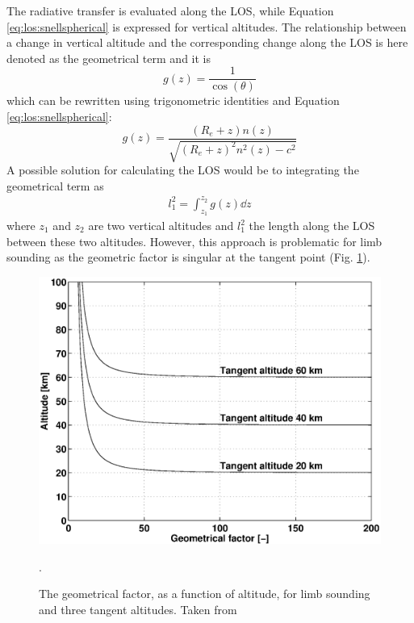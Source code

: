   The radiative transfer is evaluated along the LOS, while Equation 
  \ref{eq:los:snellspherical} is expressed for vertical altitudes.
  The relationship between a change in vertical altitude and the
  corresponding change along the LOS is here denoted as the geometrical term
  and it is \citep{eriksson:97a}
  \begin{equation}
    g(z) = \frac{1}{\cos(\theta)}
  \end{equation}
  which can be rewritten using trigonometric identities and Equation
  \ref{eq:los:snellspherical}:
  \begin{equation}
    g(z) = \frac {(R_e+z)n(z)} {\sqrt{ (R_e+z)^2n^2(z) - c^2 }}
   \label{eq:los:gterm}
  \end{equation}
  A possible solution for calculating the LOS would be to integrating the
  geometrical term as \citep{eriksson:00a}
  \begin{eqnarray}
    l_1^2 = \int_{z_1}^{z_2}{g(z)\dd z} \nonumber
  \end{eqnarray}
  where $z_1$ and $z_2$ are two vertical altitudes and $l_1^2$ the length
  along the LOS between these two altitudes. However, this approach is
  problematic for limb sounding as the geometric factor is
  singular at the tangent point (Fig. \ref{fig:los:gfac}). 
  \begin{figure}
   \begin{center}
    \includegraphics*[width=0.8\hsize]{Figs/fig_geomfac.eps}
     \caption{The geometrical factor, as a function of altitude, for limb 
              sounding and three tangent altitudes. Taken from
              \citet{eriksson:97a}}.
    \label{fig:los:gfac}
   \end{center} 
  \end{figure}



